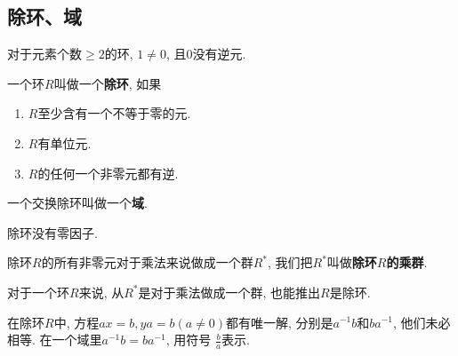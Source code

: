 

\subsection{除环、域} %

\begin{Proposition}
对于元素个数$\ge 2$的环, $\mathfrak{1} \neq \mathfrak{0}$, 且$\mathfrak{0}$没有逆元.
\end{Proposition}

\begin{Definition}[除环]
一个环$R$叫做一个\textbf{除环}, 如果
\begin{enumerate}
	\item $R$至少含有一个不等于零的元.
	\item $R$有单位元.
	\item $R$的任何一个非零元都有逆.
\end{enumerate}
\end{Definition}

\begin{Definition}[域]
一个交换除环叫做一个\textbf{域}.
\end{Definition}

\begin{Property}
除环没有零因子.
\end{Property}

\begin{Property}
除环$R$的所有非零元对于乘法来说做成一个群$R^*$, 我们把$R^*$叫做\textbf{除环$R$的乘群}.
\end{Property}

\begin{Note}
对于一个环$R$来说, 从$R^*$是对于乘法做成一个群, 也能推出$R$是除环.
\end{Note}

\begin{Note}
在除环$R$中, 方程$ax = b, ya = b (a \neq \mathfrak{0})$都有唯一解, 分别是$a^{-1}b$和$ba^{-1}$, 他们未必相等. 在一个域里$a^{-1}b = ba^{-1}$, 用符号
$\displaystyle \frac{b}{a}$表示.
\end{Note}

